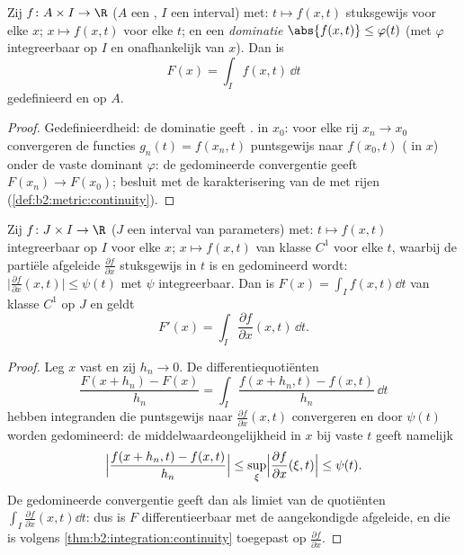 \begin{theorem}\label{thm:b2:integration:continuity}
Zij $f \colon A \times I \to \R$ ($A$ een , $I$ een
interval) met: $t \mapsto f(x, t)$ stuksgewijs  voor elke
$x$; $x \mapsto f(x, t)$  voor elke $t$; en een
\emph{dominatie} $\abs{f(x,t)} \leq \varphi(t)$ (met $\varphi$
integreerbaar op $I$ en onafhankelijk van $x$). Dan is
\[
F(x) = \int_I f(x, t)\,\dd t
\]
gedefinieerd en  op $A$.
\end{theorem}

\begin{proof}
Gedefinieerdheid: de dominatie geeft .
 in $x_0$: voor elke rij $x_n \to x_0$ convergeren de
functies $g_n(t) = f(x_n, t)$ puntsgewijs naar $f(x_0, t)$
( in $x$) onder de vaste dominant $\varphi$: de
gedomineerde convergentie geeft $F(x_n) \to F(x_0)$; besluit met
de karakterisering van de  met rijen
(\cref{def:b2:metric:continuity}).
\end{proof}

\begin{theorem}\label{thm:b2:integration:leibnizrule}
Zij $f \colon J \times I \to \R$ ($J$ een interval van parameters)
met: $t \mapsto f(x,t)$ integreerbaar op $I$ voor elke $x$; $x
\mapsto f(x,t)$ van klasse $C^1$ voor elke $t$, waarbij de partiële
afgeleide $\frac{\partial f}{\partial x}$ stuksgewijs  in
$t$ is en gedomineerd wordt: $\bigl|\frac{\partial f}{\partial
x}(x,t)\bigr| \leq \psi(t)$ met $\psi$ integreerbaar. Dan is $F(x)
= \int_I f(x,t)\dd t$ van klasse $C^1$ op $J$ en geldt
\[
F'(x) = \int_I \frac{\partial f}{\partial x}(x, t)\,\dd t .
\]
\end{theorem}

\begin{proof}
Leg $x$ vast en zij $h_n \to 0$. De differentiequotiënten
\[
\frac{F(x + h_n) - F(x)}{h_n}
= \int_I \frac{f(x + h_n, t) - f(x, t)}{h_n}\,\dd t
\]
hebben integranden die puntsgewijs naar $\frac{\partial
f}{\partial x}(x, t)$ convergeren en door $\psi(t)$ worden
gedomineerd: de middelwaardeongelijkheid in $x$ bij vaste $t$ geeft
namelijk
\[
\Bigl|\frac{f(x + h_n, t) - f(x,t)}{h_n}\Bigr|
\leq \sup_{\xi} \Bigl|\frac{\partial f}{\partial x}(\xi, t)\Bigr|
\leq \psi(t) .
\]
De gedomineerde convergentie geeft dan als limiet van de
quotiënten $\int_I \frac{\partial f}{\partial x}(x,t)\dd t$: dus
is $F$ differentieerbaar met de aangekondigde afgeleide, en die is
 volgens \cref{thm:b2:integration:continuity} toegepast op
$\frac{\partial f}{\partial x}$.
\end{proof}

